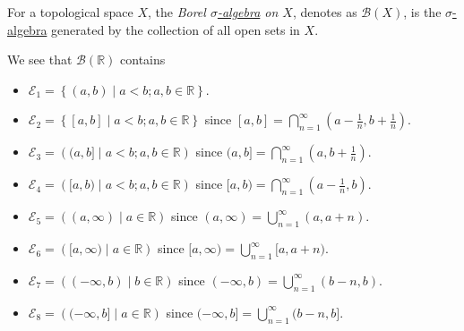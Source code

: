 \begin{definition}\label{def:Borel-sigma-algebra}
	For a topological space \(X\), the \emph{Borel \hyperref[def:sigma-algebra]{\(\sigma\)-algebra} on \(X\)}, denotes as \(\mathcal{B}(X)\),
	is the \hyperref[def:sigma-algebra]{\(\sigma\)-algebra} generated by the collection of all open sets in \(X\).
\end{definition}

\begin{eg}\label{eg:lec2}
	We see that \(\mathcal{B} (\mathbb{R} )\) contains
	\begin{itemize}
		\item \(\mathcal{E}_1 = \left\{(a, b) \mid a < b; a, b\in \mathbb{R} \right\}\).
		\item \(\mathcal{E}_2 = \left\{[a, b] \mid a < b; a, b\in \mathbb{R} \right\}\) since \([a, b] = \bigcap_{n=1}^{\infty} (a - \frac{1}{n}, b + \frac{1}{n})\).
		\item \(\mathcal{E}_3 = \left((a, b]  \mid a < b; a, b\in \mathbb{R} \right)\) since \((a, b] = \bigcap_{n=1}^{\infty} (a, b + \frac{1}{n})\).
		\item \(\mathcal{E}_4 = \left([a, b)  \mid a < b; a, b\in \mathbb{R} \right)\) since \([a, b) = \bigcap_{n=1}^{\infty} (a - \frac{1}{n}, b)\).
		\item \(\mathcal{E}_5 = \left((a, \infty)  \mid a\in \mathbb{R} \right)\) since \((a, \infty) = \bigcup_{n=1}^{\infty} (a , a + n)\).
		\item \(\mathcal{E}_6 = \left([a, \infty)  \mid a\in \mathbb{R} \right)\) since \([a, \infty) = \bigcup_{n=1}^{\infty} [a , a + n)\).
		\item \(\mathcal{E}_7 = \left((-\infty, b) \mid b\in \mathbb{R} \right)\) since \((-\infty, b) = \bigcup_{n=1}^{\infty} (b - n, b)\).
		\item \(\mathcal{E}_8 = \left((-\infty, b] \mid a\in \mathbb{R} \right)\) since \((-\infty, b] = \bigcup_{n=1}^{\infty} (b - n, b]\).
	\end{itemize}
\end{eg}

